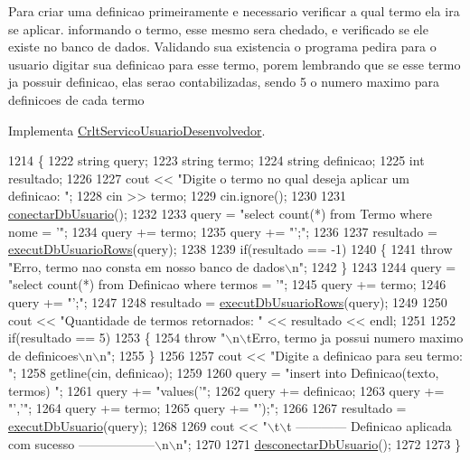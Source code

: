 Para criar uma definicao primeiramente e necessario verificar a qual termo ela ira se aplicar. informando o termo, esse mesmo sera chedado, e verificado se ele existe no banco de dados. Validando sua existencia o programa pedira para o usuario digitar sua definicao para esse termo, porem lembrando que se esse termo ja possuir definicao, elas serao contabilizadas, sendo 5 o numero maximo para definicoes de cada termo

Implementa \mbox{\hyperlink{class_crlt_servico_usuario_desenvolvedor_af9f1bd8b7ec576adb4bc2a8ac14e0905}{Crlt\+Servico\+Usuario\+Desenvolvedor}}.


\begin{DoxyCode}
1214 \{
1222   \textcolor{keywordtype}{string} query;
1223   \textcolor{keywordtype}{string} termo;
1224   \textcolor{keywordtype}{string} definicao;
1225   \textcolor{keywordtype}{int} resultado;
1226 
1227   cout << \textcolor{stringliteral}{"Digite o termo no qual deseja aplicar um definicao: "};
1228   cin >> termo;
1229   cin.ignore();
1230 
1231   \mbox{\hyperlink{comando_sql_8cpp_a4f89ddcbc4cf8f2587d89f72f8c7900d}{conectarDbUsuario}}();
1232 
1233   query = \textcolor{stringliteral}{"select count(*) from Termo where nome = '"};
1234   query += termo;
1235   query += \textcolor{stringliteral}{"';"};
1236 
1237   resultado = \mbox{\hyperlink{comando_sql_8cpp_af54952694f2fa7d76f969fb74b853cb9}{executDbUsuarioRows}}(query);
1238 
1239   \textcolor{keywordflow}{if}(resultado == -1)
1240   \{
1241     \textcolor{keywordflow}{throw} \textcolor{stringliteral}{"Erro, termo nao consta em nosso banco de dados\(\backslash\)n"};
1242   \}
1243 
1244   query = \textcolor{stringliteral}{"select count(*) from Definicao where termos = '"};
1245   query += termo;
1246   query += \textcolor{stringliteral}{"';"};
1247 
1248   resultado = \mbox{\hyperlink{comando_sql_8cpp_af54952694f2fa7d76f969fb74b853cb9}{executDbUsuarioRows}}(query);
1249 
1250   cout << \textcolor{stringliteral}{"Quantidade de termos retornados: "} << resultado << endl;
1251 
1252   \textcolor{keywordflow}{if}(resultado == 5)
1253   \{
1254     \textcolor{keywordflow}{throw} \textcolor{stringliteral}{"\(\backslash\)n\(\backslash\)tErro, termo ja possui numero maximo de definicoes\(\backslash\)n\(\backslash\)n"};
1255   \}
1256 
1257   cout << \textcolor{stringliteral}{"Digite a definicao para seu termo: "};
1258   getline(cin, definicao);
1259 
1260   query = \textcolor{stringliteral}{"insert into Definicao(texto, termos) "};
1261   query += \textcolor{stringliteral}{"values('"};
1262   query += definicao;
1263   query += \textcolor{stringliteral}{"','"};
1264   query += termo;
1265   query += \textcolor{stringliteral}{"');"};
1266 
1267   resultado = \mbox{\hyperlink{comando_sql_8cpp_a748197580e7f9acdbf48c78de1f7924b}{executDbUsuario}}(query);
1268 
1269   cout << \textcolor{stringliteral}{"\(\backslash\)t\(\backslash\)t ------------ Definicao aplicada com sucesso ------------------\(\backslash\)n\(\backslash\)n"};
1270 
1271   \mbox{\hyperlink{comando_sql_8cpp_a969be9911913568e30d4ae8963338bc3}{desconectarDbUsuario}}();
1272 
1273 \}
\end{DoxyCode}
